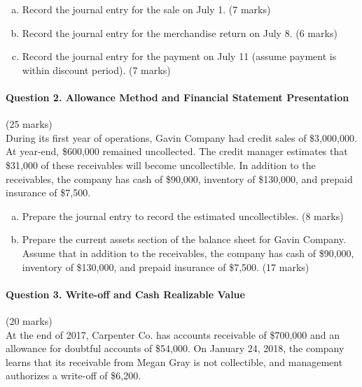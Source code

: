 \documentclass[12pt]{article}
\newcommand{\questionspace}{\vspace{3cm}}        %
\newcommand{\longanswer}{\vspace{4cm}}           %
\newcommand{\journalspace}{\vspace{4.5cm}}       %
\begin{document}
\begin{enumerate}[(a)]
    \item Record the journal entry for the sale on July 1. \hfill (7 marks)
    
    \journalspace
    
    \item Record the journal entry for the merchandise return on July 8. \hfill (6 marks)
    
    \journalspace
    
    \item Record the journal entry for the payment on July 11 (assume payment is within discount period). \hfill (7 marks)
    
    \journalspace
\end{enumerate}

\newpage
\paragraph{Question 2. Allowance Method and Financial Statement Presentation}\hfill (25 marks)\\
During its first year of operations, Gavin Company had credit sales of \$3,000,000. At year-end, \$600,000 remained uncollected. The credit manager estimates that \$31,000 of these receivables will become uncollectible. In addition to the receivables, the company has cash of \$90,000, inventory of \$130,000, and prepaid insurance of \$7,500.

\begin{enumerate}[(a)]
    \item Prepare the journal entry to record the estimated uncollectibles. \hfill (8 marks)
    
    \journalspace
    
    \item Prepare the current assets section of the balance sheet for Gavin Company. Assume that in addition to the receivables, the company has cash of \$90,000, inventory of \$130,000, and prepaid insurance of \$7,500. \hfill (17 marks)
    
    \longanswer
\end{enumerate}

\questionspace
\paragraph{Question 3. Write-off and Cash Realizable Value}\hfill (20 marks)\\
At the end of 2017, Carpenter Co. has accounts receivable of \$700,000 and an allowance for doubtful accounts of \$54,000. On January 24, 2018, the company learns that its receivable from Megan Gray is not collectible, and management authorizes a write-off of \$6,200.
\end{document}
